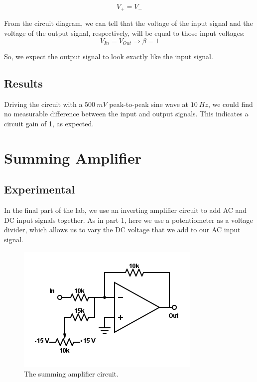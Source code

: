 \documentclass[11pt]{article}
\begin{document}
\begin{equation}
    V_{+} = V_{-}
\end{equation}

From the circuit diagram, we can tell that the voltage of the input signal and the voltage of the output signal, respectively, will be equal to those input voltages:\\

\begin{equation}
    V_{In} = V_{Out} \Longrightarrow \beta = 1
\end{equation}

So, we expect the output signal to look exactly like the input signal.\\


\subsection{Results}

Driving the circuit with a $500\ mV$ peak-to-peak sine wave at $10\ Hz$, we could find no measurable difference between the input and output signals. This indicates a circuit gain of 1, as expected.\\


\section{Summing Amplifier}
\subsection{Experimental}

In the final part of the lab, we use an inverting amplifier circuit to add AC and DC input signals together. As in part 1, here we use a potentiometer as a voltage divider, which allows us to vary the DC voltage that we add to our AC input signal.\\

\begin{figure}[H]
    \centering
    \includegraphics[scale=0.5]{Diagrams/c-e.png}
    \caption{The summing amplifier circuit.}
    \label{circuit:e}
\end{figure}
\end{document}
